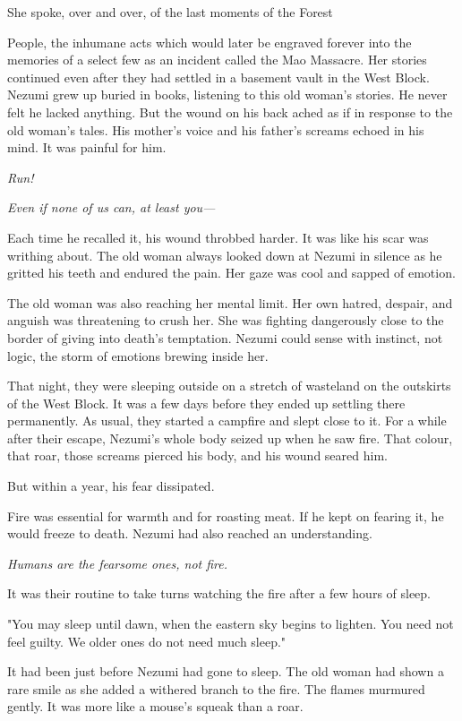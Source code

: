 She spoke, over and over, of the last moments of the Forest~

People, the inhumane acts which would later be engraved forever into the
memories of a select few as an incident called the Mao Massacre. Her
stories continued even after they had settled in a basement vault in the
West Block. Nezumi grew up buried in books, listening to this old
woman's stories. He never felt he lacked anything. But the wound on his
back ached as if in response to the old woman's tales. His mother's
voice and his father's screams echoed in his mind. It was painful for
him.

\emph{Run!}

\emph{Even if none of us can, at least you---}

Each time he recalled it, his wound throbbed harder. It was like his
scar was writhing about. The old woman always looked down at Nezumi in
silence as he gritted his teeth and endured the pain. Her gaze was cool
and sapped of emotion.

The old woman was also reaching her mental limit. Her own hatred,
despair, and anguish was threatening to crush her. She was fighting
dangerously close to the border of giving into death's temptation.
Nezumi could sense with instinct, not logic, the storm of emotions
brewing inside her.

That night, they were sleeping outside on a stretch of wasteland on the
outskirts of the West Block. It was a few days before they ended up
settling there permanently. As usual, they started a campfire and slept
close to it. For a while after their escape, Nezumi's whole body seized
up when he saw fire. That colour, that roar, those screams pierced his
body, and his wound seared him.

But within a year, his fear dissipated.

Fire was essential for warmth and for roasting meat. If he kept on
fearing it, he would freeze to death. Nezumi had also reached an
understanding.

\emph{Humans are the fearsome ones, not fire.}

It was their routine to take turns watching the fire after a few hours
of sleep.

"You may sleep until dawn, when the eastern sky begins to lighten. You
need not feel guilty. We older ones do not need much sleep."

It had been just before Nezumi had gone to sleep. The old woman had
shown a rare smile as she added a withered branch to the fire. The
flames murmured gently. It was more like a mouse's squeak than a roar.

